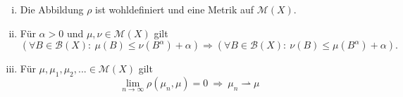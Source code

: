 \begin{proposition}
    \begin{enumerate}[(i)]
        \item Die Abbildung $\rho$ ist wohldefiniert und eine Metrik auf $\mathcal{M}(X)$. 
        \item Für $\alpha > 0$ und $\mu, \nu \in \mathcal{M}(X)$ gilt
        $$
            (\forall B \in \mathcal{B}(X): \ \mu(B) \leq \nu(B^{\alpha}) + \alpha) \Rightarrow (\forall B \in \mathcal{B}(X): \ \nu(B) \leq \mu(B^{\alpha}) + \alpha).
        $$
        \item Für $\mu, \mu_1, \mu_2,... \in \mathcal{M}(X)$ gilt 
        $$
            \lim_{n \to \infty} \rho(\mu_n, \mu) = 0 \ \Rightarrow \ \mu_n \rightharpoonup \mu 
        $$
    \end{enumerate}
\end{proposition}

